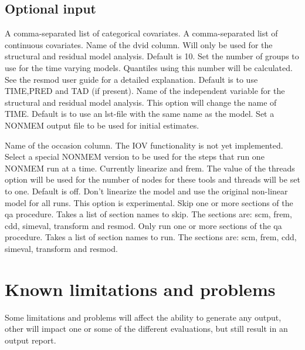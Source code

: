 \subsection{Optional input}

\begin{optionlist}
A comma-separated list of categorical covariates.
\nextopt
{}
A comma-separated list of continuous covariates.
\nextopt
{}
Name of the dvid column.
Will only be used for the structural and residual model analysis.
\nextopt
{}
Default is 10. Set the number of groups to use for the time varying models.
Quantiles using this number will be calculated. See the resmod user guide
for a detailed explanation.
\nextopt
{}
Default is to use TIME,PRED and TAD (if present). Name of the independent variable for the structural and residual model analysis.
This option will change the name of TIME.
\nextopt
{}
Default is to use an lst-file with the same name as the model. Set a NONMEM output file to be used for initial estimates.

\nextopt
{}
Name of the occasion column. The IOV functionality is not yet implemented.
\nextopt
{}
	Select a special NONMEM version to be used for the steps
    that run one NONMEM run at a time. Currently linearize
    and frem. The value of the threads option will be used for
    the number of nodes for these tools and threads will be set
    to one.
\nextopt
{}
Default is off. Don't linearize the model and use the original non-linear model for all runs.
This option is experimental.
\nextopt
{}
Skip one or more sections of the qa procedure. Takes a list of section names to skip. The sections are: scm, frem, cdd, simeval,
transform and resmod.
\nextopt
{}
Only run one or more sections of the qa procedure. Takes a list of section names to run. The sections are: scm, frem, cdd, simeval, transform and resmod.
\nextopt
\end{optionlist}

\section{Known limitations and problems}

Some limitations and problems will affect the ability to generate any output, other will impact one or some of the different evaluations, but still result in an output report. 

